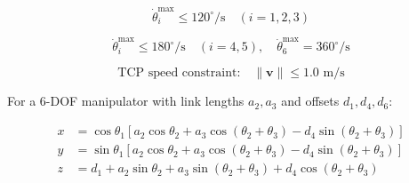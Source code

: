 \documentclass[border=10pt, convert={png300}]{standalone}
\begin{document}

\[
\dot{\theta}_i^{\max} \leq 120^\circ/\text{s} \quad (i = 1,2,3)
\]

\[
\dot{\theta}_i^{\max} \leq 180^\circ/\text{s} \quad (i = 4,5), \quad \dot{\theta}_6^{\max} = 360^\circ/\text{s}
\]

\[
\text{TCP speed constraint:} \quad \|\mathbf{v}\| \leq 1.0 \text{ m/s}
\]


For a 6-DOF manipulator with link lengths $a_2, a_3$ and offsets $d_1, d_4, d_6$:

\[
\begin{aligned}
x &= \cos\theta_1\left[a_2\cos\theta_2 + a_3\cos(\theta_2+\theta_3) - d_4\sin(\theta_2+\theta_3)\right] \\
y &= \sin\theta_1\left[a_2\cos\theta_2 + a_3\cos(\theta_2+\theta_3) - d_4\sin(\theta_2+\theta_3)\right] \\
z &= d_1 + a_2\sin\theta_2 + a_3\sin(\theta_2+\theta_3) + d_4\cos(\theta_2+\theta_3)
\end{aligned}
\]
\end{document}
